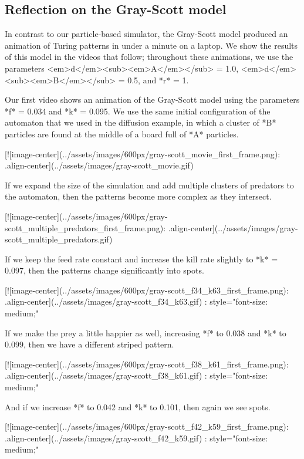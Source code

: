{{{{{{{{{{{\FloatBarrier
{}
\subsection{Reflection on the Gray-Scott model}

In contrast to our particle-based simulator, the Gray-Scott model produced an animation of Turing patterns in under a minute on a laptop. We show the results of this model in the videos that follow; throughout these animations, we use the parameters <em>d</em><sub><em>A</em></sub> = 1.0, <em>d</em><sub><em>B</em></sub> = 0.5, and *r* = 1.

Our first video shows an animation of the Gray-Scott model using the parameters *f* = 0.034 and *k* = 0.095. We use the same initial configuration of the automaton that we used in the diffusion example, in which a cluster of *B* particles are found at the middle of a board full of *A* particles.

[![image-center](../assets/images/600px/gray-scott_movie_first_frame.png){: .align-center}](../assets/images/gray-scott_movie.gif)

If we expand the size of the simulation and add multiple clusters of predators to the automaton, then the patterns become more complex as they intersect.

[![image-center](../assets/images/600px/gray-scott_multiple_predators_first_frame.png){: .align-center}](../assets/images/gray-scott_multiple_predators.gif)

If we keep the feed rate constant and increase the kill rate slightly to *k* = 0.097, then the patterns change significantly into spots.

[![image-center](../assets/images/600px/gray-scott_f34_k63_first_frame.png){: .align-center}](../assets/images/gray-scott_f34_k63.gif)
{: style="font-size: medium;"}

If we make the prey a little happier as well, increasing  *f* to 0.038 and *k* to 0.099, then we have a different striped pattern.

[![image-center](../assets/images/600px/gray-scott_f38_k61_first_frame.png){: .align-center}](../assets/images/gray-scott_f38_k61.gif)
{: style="font-size: medium;"}

And if we increase *f* to 0.042 and *k* to 0.101, then again we see spots.

[![image-center](../assets/images/600px/gray-scott_f42_k59_first_frame.png){: .align-center}](../assets/images/gray-scott_f42_k59.gif)
{: style="font-size: medium;"}

}}}}}}}}}}}
